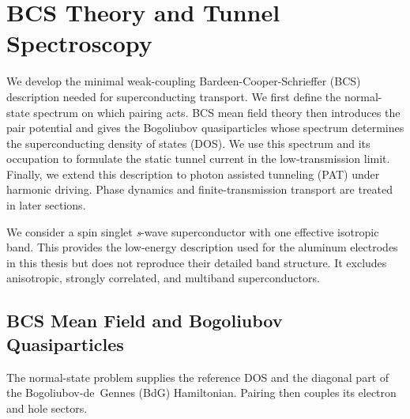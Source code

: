 
\section{BCS Theory and Tunnel Spectroscopy}
\label{sec:micro}

    We develop the minimal weak-coupling Bardeen-Cooper-Schrieffer (BCS) description needed for superconducting transport. We first define the normal-state spectrum on which pairing acts. BCS mean field theory then introduces the pair potential and gives the Bogoliubov quasiparticles whose spectrum determines the superconducting density of states (DOS). We use this spectrum and its occupation to formulate the static tunnel current in the low-transmission limit. Finally, we extend this description to photon assisted tunneling (PAT) under harmonic driving. Phase dynamics and finite-transmission transport are treated in later sections. \cite{bardeen_theory_1957,tinkham_introduction_2004}

    We consider a spin singlet \textit{s}-wave superconductor with one effective isotropic band. This provides the low-energy description used for the aluminum electrodes in this thesis but does not reproduce their detailed band structure. It excludes anisotropic, strongly correlated, and multiband superconductors.

    \subsection{BCS Mean Field and Bogoliubov Quasiparticles}
    \label{subsec:micro:bcs-bdg}

        The normal-state problem supplies the reference DOS and the diagonal part of the Bogoliubov-de~Gennes (BdG) Hamiltonian. Pairing then couples its electron and hole sectors.


